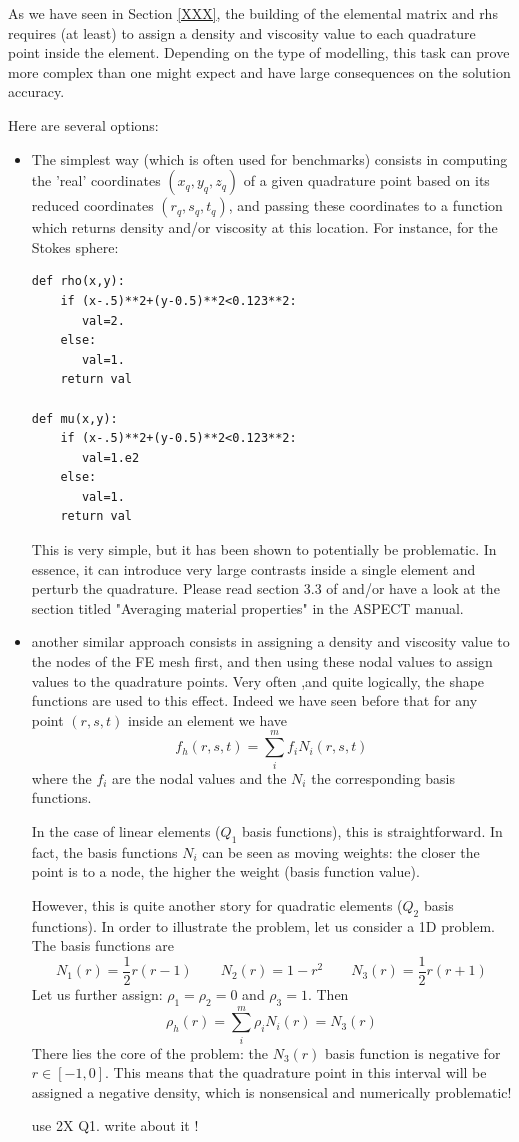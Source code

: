 
As we have seen in Section \ref{XXX}, the building of the elemental matrix and rhs
requires (at least) to assign a density and viscosity value to each quadrature point inside
the element. Depending on the type of modelling, this task can prove more complex than 
one might expect and have large consequences on the solution accuracy.

Here are several options:

\begin{itemize}
\item The simplest way (which is often used for benchmarks) consists in computing the 'real'
coordinates $(x_q,y_q,z_q)$ of a given quadrature point based on its reduced coordinates 
$(r_q,s_q,t_q)$, and passing these coordinates to a function which returns density and/or viscosity
at this location. For instance, for the Stokes sphere:
\begin{verbatim}
def rho(x,y):
    if (x-.5)**2+(y-0.5)**2<0.123**2:
       val=2.
    else:
       val=1.
    return val

def mu(x,y):
    if (x-.5)**2+(y-0.5)**2<0.123**2:
       val=1.e2
    else:
       val=1.
    return val
\end{verbatim}
This is very simple, but it has been shown to potentially be problematic. In essence, it can introduce very large contrasts inside a single element and perturb the quadrature. Please read section 3.3 of \cite{hedg17} and/or
have a look at the section titled "Averaging material properties" in the ASPECT manual.

\item another similar approach consists in assigning a density and viscosity value to the nodes of the FE mesh first, and then using these nodal values to assign values to the quadrature points. Very often ,and quite logically, the shape functions are used to this effect. Indeed we have seen before that for any point $(r,s,t)$ inside an element we have
\[
f_h(r,s,t) = \sum_{i}^m f_i N_i(r,s,t)
\]  
where the $f_i$ are the nodal values and the $N_i$ the corresponding basis functions. 

In the case of linear elements ($Q_1$ basis functions), this is straightforward. In fact, the basis functions $N_i$ can be seen as moving weights: the closer the point is to a node, the higher the weight (basis function value). 

However, this is quite another story for quadratic elements ($Q_2$ basis functions). In order to illustrate the 
problem, let us consider a 1D problem. The basis functions are 
\[
N_1(r) =\frac{1}{2}r(r-1)
\quad\quad
N_2(r)=1-r^2
\quad\quad
N_3(r) =\frac{1}{2}r(r+1)
\]
Let us further assign: $\rho_1=\rho_2=0$ and $\rho_3=1$. Then 
\[
\rho_h(r) = \sum_{i}^m \rho_i N_i(r) = N_3(r)
\]  
There lies the core of the problem: the $N_3(r)$ basis function is negative for $r\in[-1,0]$. This means that the quadrature point in this interval will be assigned a negative density, which is nonsensical and numerically problematic!

{\color{red} use 2X Q1. write about it !}

\end{itemize}

